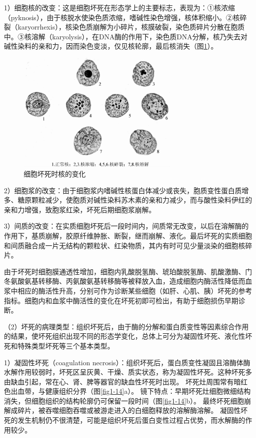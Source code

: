 1）细胞核的改变：这是细胞坏死在形态学上的主要标志，表现为：①核浓缩（pyknosis），由于核脱水使染色质浓缩，嗜碱性染色增强，核体积缩小。②核碎裂（karyorrhexis），核染色质崩解为小碎片，核膜破裂，染色质碎片分散在胞质中。③核溶解（karyolysis），在DNA酶的作用下，染色质DNA分解，核乃失去对碱性染料的亲和力，因而染色变淡，仅见核轮廓，最后核消失（图\ref{fig1-13}）。

\begin{figure}[!htbp]
	\centering
    \includegraphics[width=0.7\textwidth]{./images/Image00014.jpg}
	\caption{细胞坏死时核的变化}
	\label{fig1-13} 
	\end{figure} 

2）细胞浆的改变：由于细胞浆内嗜碱性核蛋白体减少或丧失，胞质变性蛋白质增多、糖原颗粒减少，使胞质对碱性染料苏木素的亲和力减少，而与酸性染料伊红的亲和力增强，致胞浆红染，坏死后期细胞浆崩解。

3）间质的改变：在实质细胞坏死后一段时间内，间质常无改变，以后在溶解酶的作用下，基质崩解，胶原纤维肿胀、断裂，继而崩解、液化。最后坏死的实质细胞和间质融合成一片无结构的颗粒状、红染物质，其内有时可见少量淡染的细胞核碎片。

由于坏死时细胞膜通透性增加，细胞内乳酸脱氢酶、琥珀酸脱氢酶、肌酸激酶、门冬氨酸氨基转移酶、丙氨酸氨基转移酶等被释放入血，造成细胞内酶活性降低而血浆中相应的酶活性升高，分别可作为诊断某些细胞（如肝、心肌、胰）坏死的参考指标。细胞内和血浆中酶活性的变化在坏死初即可检出，有助于细胞损伤早期诊断。

（2）坏死的病理类型：组织坏死后，由于酶的分解和蛋白质变性等因素综合作用的结果，使坏死组织出现不同的形态学变化，总体上可分为凝固性坏死、液化性坏死和特殊类型坏死等三个基本类型。

1）凝固性坏死（coagulation
necrosis）：组织坏死后，蛋白质变性凝固且溶酶体酶水解作用较弱时，坏死区呈灰黄、干燥、质实状态，称为凝固性坏死。这种坏死多由缺血引起，常在心、肾、脾等器官的缺血性坏死时出现。
坏死灶周围常有暗红色出血带，与健康组织分界（图\ref{fig1-14}a）。
镜下特点：早期坏死灶细胞微细结构消失，但细胞组织的结构轮廓仍可保留一段时间（图\ref{fig1-14}b）。
最终坏死细胞崩解成碎片，被吞噬细胞吞噬或被游走进入的白细胞释放的溶解酶溶解。
凝固性坏死的发生机制仍不很清楚，可能是组织坏死后蛋白变性过程占优势，而水解酶的作用较少。

